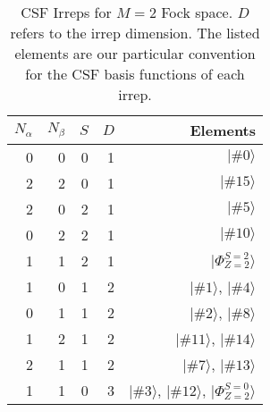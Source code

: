 \begin{table}[ht!]
\centering
\caption{CSF Irreps for $M=2$ Fock space. $D$ refers to the irrep dimension. The
listed elements are our particular convention for the CSF basis functions of
each irrep.}
\label{tab:csfs}
\begin{tabular}{rrrrr}
\hline
\hline
$N_{\alpha}$ & $N_{\beta}$ & $S$ & $D$ & Elements \\
\hline
0 & 0 & 0 & 1 & $|\#0\rangle$ \\
2 & 2 & 0 & 1 & $|\#15\rangle$ \\
2 & 0 & 2 & 1 & $|\#5\rangle$ \\
0 & 2 & 2 & 1 & $|\#10\rangle$ \\
1 & 1 & 2 & 1 & $|\Phi_{Z=2}^{S=2}\rangle$ \\
1 & 0 & 1 & 2 & $|\#1\rangle$, $|\#4\rangle$ \\
0 & 1 & 1 & 2 & $|\#2\rangle$, $|\#8\rangle$ \\
1 & 2 & 1 & 2 & $|\#11\rangle$, $|\#14\rangle$ \\
2 & 1 & 1 & 2 & $|\#7\rangle$, $|\#13\rangle$ \\
1 & 1 & 0 & 3 & $|\#3\rangle$, $|\#12\rangle$, $|\Phi_{Z=2}^{S=0}\rangle$ \\
\hline
\hline
\end{tabular}
\end{table}